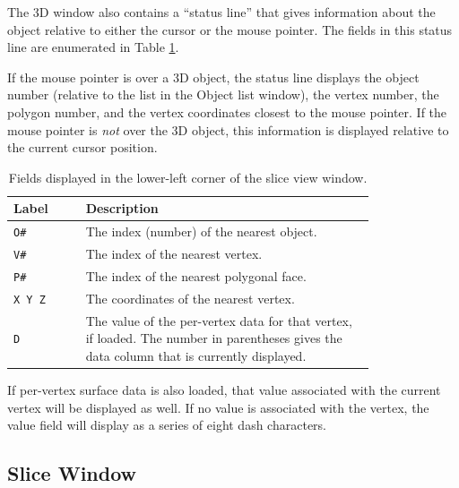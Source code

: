 \documentclass[11pt,letterpaper]{article}
\newcommand{\ident}[1]{{\tt #1}}
\begin{document}
The 3D window also contains a ``status line'' that gives information about
the object relative to either the cursor or the mouse pointer. The fields
in this status line are enumerated in Table \ref{tab3DFields}.

If the mouse pointer is over a 3D object, the status line displays the
object number (relative to the list in the Object list window), the
vertex number, the polygon number, and the vertex coordinates closest
to the mouse pointer. If the mouse pointer is {\em not} over the 3D
object, this information is displayed relative to the current cursor
position.

\begin{table}
\centering
\caption{Fields displayed in the lower-left corner of the slice view window.}
\begin{tabular}{lp{0.8\linewidth}}
Label & Description \\
\hline
\ident{O\#} & The index (number) of the nearest object. \\
\ident{V\#} & The index of the nearest vertex. \\
\ident{P\#} & The index of the nearest polygonal face. \\
\ident{X Y Z} & The coordinates of the nearest vertex. \\
\ident{D} & The value of the per-vertex data for that vertex, if
loaded. The number in parentheses gives the data column that is
currently displayed.\\
\hline
\end{tabular}
\label{tab3DFields}
\end{table}

If per-vertex surface data is also loaded, that value associated with
the current vertex will be displayed as well. If no value is associated
with the vertex, the value field will display as a series of eight 
dash characters.

\subsection{Slice Window}
\end{document}

